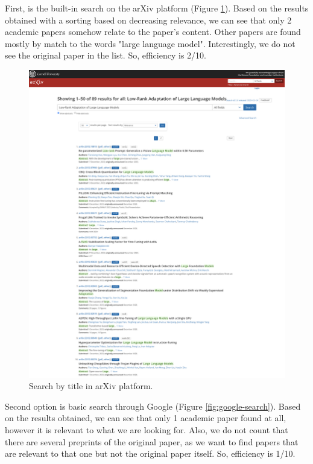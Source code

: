 \documentclass{article}
\begin{document}
    First, is the built-in search on the arXiv platform (Figure \ref{fig:arxiv-search}). Based on the results obtained with a sorting based on decreasing relevance, we can see that only 2 academic papers somehow relate to the paper's content. Other papers are found mostly by match to the words "large language model". Interestingly, we do not see the original paper in the list. So, efficiency is 2/10.

    \begin{figure}[H]
        \centering
        \includegraphics[width=0.89\linewidth]{img/search_arxiv.png}
        \caption{Search by title in arXiv platform.}
        \label{fig:arxiv-search}
    \end{figure}

    Second option is basic search through Google (Figure \ref{fig:google-search}). Based on the results obtained, we can see that only 1 academic paper found at all, however it is relevant to what we are looking for. Also, we do not count that there are several preprints of the original paper, as we want to find papers that are relevant to that one but not the original paper itself. So, efficiency is 1/10. 
    
\end{document}

